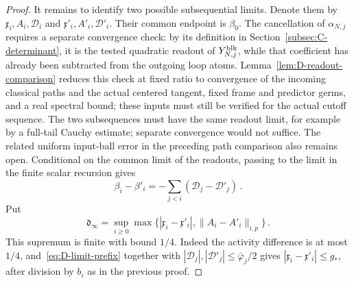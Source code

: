 \begin{proof}
It remains to identify two possible subsequential limits. Denote them by $\mathfrak x_i,A_i,\mathcal D_i$ and $\mathfrak x'_i,A'_i,\mathcal D'_i$. Their common endpoint is $\beta_0$. The cancellation of $\alpha_{N,j}$ requires a separate convergence check: by its definition in Section~\ref{subsec:C-determinant}, it is the tested quadratic readout of $Y^{\rm blk}_{N,j}$, while that coefficient has already been subtracted from the outgoing loop atoms. Lemma~\ref{lem:D-readout-comparison} reduces this check at fixed ratio to convergence of the incoming classical paths and the actual centered tangent, fixed frame and predictor germs, and a real spectral bound; these inputs must still be verified for the actual cutoff sequence. The two subsequences must have the same readout limit, for example by a full-tail Cauchy estimate; separate convergence would not suffice. The related uniform input-ball error in the preceding path comparison also remains open. Conditional on the common limit of the readouts, passing to the limit in the finite scalar recursion gives
\begin{equation}\label{eq:D-limit-prefix}
\beta_i-\beta'_i=-\sum_{j<i}(\mathcal D_j-\mathcal D'_j)\,.
\end{equation}
Put
\begin{equation*}
\mathfrak d_\infty=\sup_{i\ge0}\max\{|\mathfrak x_i-\mathfrak x'_i|,\|A_i-A'_i\|_{i,p}\}\,.
\end{equation*}
This supremum is finite with bound $1/4$. Indeed the activity difference is at most $1/4$, and~\eqref{eq:D-limit-prefix} together with $|\mathcal D_j|,|\mathcal D'_j|\le \bar\varphi_j/2$ gives $|\mathfrak x_i-\mathfrak x'_i|\le g_*$, after division by $b_i$ as in the previous proof.


\end{proof}
